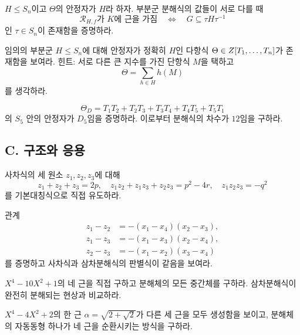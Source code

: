 \begin{exercise}[*]
$H\le S_n$이고 $\Theta$의 안정자가 $H$라 하자. 부분군 분해식의 값들이 서로 다를 때
\[
  \mathcal R_{H,f}\text{가 }K\text{에 근을 가짐}
  \quad\Longleftrightarrow\quad
  G\subseteq\tau H\tau^{-1}
\]
인 $\tau\in S_n$이 존재함을 증명하라.
\end{exercise}

\begin{exercise}
임의의 부분군 $H\le S_n$에 대해 안정자가 정확히 $H$인 다항식 $\Theta\in Z[T_1,\dots,T_n]$가 존재함을 보여라. 힌트: 서로 다른 큰 지수를 가진 단항식 $M$을 택하고
\[
  \Theta=\sum_{h\in H}h(M)
\]
를 생각하라.
\end{exercise}

\begin{exercise}[*]
\[
  \Theta_D=T_1T_2+T_2T_3+T_3T_4+T_4T_5+T_5T_1
\]
의 $S_5$ 안의 안정자가 $D_5$임을 증명하라. 이로부터 분해식의 차수가 $12$임을 구하라.
\end{exercise}

\subsection*{C. 구조와 응용}

\begin{exercise}
사차식의 세 원소 $z_1,z_2,z_3$에 대해
\[
  z_1+z_2+z_3=2p,
  \quad
  z_1z_2+z_1z_3+z_2z_3=p^2-4r,
  \quad
  z_1z_2z_3=-q^2
\]
를 기본대칭식으로 직접 유도하라.
\end{exercise}

\begin{exercise}
관계
\[
\begin{aligned}
  z_1-z_2&=-(x_1-x_4)(x_2-x_3),\\
  z_1-z_3&=-(x_1-x_3)(x_2-x_4),\\
  z_2-z_3&=-(x_1-x_2)(x_3-x_4)
\end{aligned}
\]
를 증명하고 사차식과 삼차분해식의 판별식이 같음을 보여라.
\end{exercise}

\begin{exercise}
$X^4-10X^2+1$의 네 근을 직접 구하고 분해체의 모든 중간체를 구하라. 삼차분해식이 완전히 분해되는 현상과 비교하라.
\end{exercise}

\begin{exercise}
$X^4-4X^2+2$의 한 근 $\alpha=\sqrt{2+\sqrt2}$가 다른 세 근을 모두 생성함을 보이고, 분해체의 자동동형 하나가 네 근을 순환시키는 방식을 구하라.
\end{exercise}

